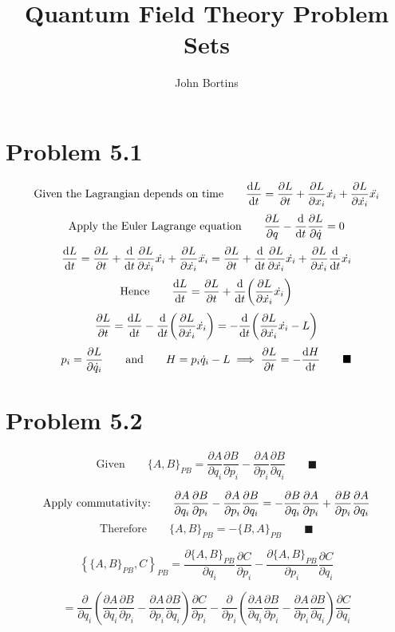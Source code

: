 \documentclass{article}
\title{Quantum Field Theory Problem Sets}
\author{John Bortins}
\begin{document}
 
\maketitle{}
 
\section*{Problem 5.1}



\[ \text{Given the Lagrangian depends on time}\qquad \dv{L}{t}=\pdv{L}{t}+\pdv{L}{x_{i}}\dot{x_{i}}+\pdv{L}{\dot{x_{i}}}\ddot{x_{i}} \]
\[ \text{Apply the Euler Lagrange equation}\qquad \pdv{L}{q}-\dv{t} \pdv{L}{\dot{q}}=0 \]
\[ \dv{L}{t}=\pdv{L}{t}+\dv{t} \pdv{L}{\dot{x_{i}}}\dot{x_{i}}+\pdv{L}{\dot{x_{i}}}\ddot{x_{i}}=\pdv{L}{t}+\dv{t} \pdv{L}{\dot{x_{i}}}\dot{x_{i}}+\pdv{L}{\dot{x_{i}}}\dv{t}\dot{x_{i}} \] 
\[ \text{Hence}\qquad \dv{L}{t}=\pdv{L}{t}+\dv{t} \qty(\pdv{L}{\dot{x_{i}}}\dot{x_{i}}) \]
\[  \pdv{L}{t}=\dv{L}{t}-\dv{t} \qty(\pdv{L}{\dot{x_{i}}}\dot{x_{i}})=-\dv{t} \qty(\pdv{L}{\dot{x_{i}}}\dot{x_{i}}-L) \]
\[ p_{i}=\pdv{L}{\dot{q}_{i}}\qquad\text{and}\qquad H=p_{i}\dot{q}_{i}-L \implies \pdv{L}{t}=-\dv{H}{t} \qquad\blacksquare \]

\section*{Problem 5.2}
 

\[ \text{Given}\qquad\{A,B\}_{PB} = \frac{\partial A}{\partial q_{i}} \frac{\partial B}{\partial p_{i}} - \frac{\partial A}{\partial p_{i}} \frac{\partial B}{\partial q_{i}} \qquad\blacksquare \]  

\[\text{Apply commutativity:}\qquad \frac{\partial A}{\partial q_{i}} \frac{\partial B}{\partial p_{i}} - \frac{\partial A}{\partial p_{i}} \frac{\partial B}{\partial q_{i}}=-\pdv{B}{q_{i}}\pdv{A}{p_{i}}+\pdv{B}{p_{i}}\pdv{A}{q_{i}}\]
\[ \text{Therefore}\qquad\{A,B\}_{PB} = -\{B,A\}_{PB} \qquad\blacksquare \]




\[ \left\{ \{A,B\}_{PB},C \right\}_{PB} =  \frac{\partial \{A,B\}_{PB}}{\partial q_{i}} \frac{\partial C}{\partial p_{i}} - \frac{\partial \{A,B\}_{PB}}{\partial p_{i}} \frac{\partial C}{\partial q_{i}} \]

\[  =  \frac{\partial }{\partial q_{i}}\left(\frac{\partial A}{\partial q_{i}} \frac{\partial B}{\partial p_{i}} - \frac{\partial A}{\partial p_{i}} \frac{\partial B}{\partial q_{i}}\right) \frac{\partial C}{\partial p_{i}} - \frac{\partial }{\partial p_{i}}\left( \frac{\partial A}{\partial q_{i}} \frac{\partial B}{\partial p_{i}} - \frac{\partial A}{\partial p_{i}} \frac{\partial B}{\partial q_{i}} \right) \frac{\partial C}{\partial q_{i}} \]
\end{document}
